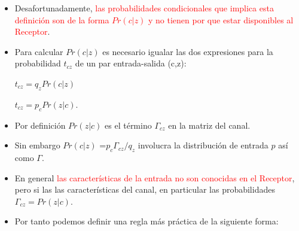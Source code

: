 \documentclass{beamer}
\theoremstyle{plain}
\theoremstyle{example}
\theoremstyle{example}
\begin{document}
\begin{frame}  \footnotesize
\begin{itemize} 

\item Desafortunadamente, \textcolor{red}{las probabilidades condicionales que implica esta definición son de la forma $Pr (c | z)$ y no tienen por que estar disponibles al Receptor}.

\item  Para calcular $Pr (c | z)$ es necesario igualar las dos expresiones para la probabilidad $t_{cz}$ de un par entrada-salida (c,z):

\begin{center}
$t_{cz}	= q_z Pr(c | z)$	      

$t_{cz}= p_c Pr(z | c)$.
\end{center}

\item  Por definición $Pr(z | c)$ es el término $\Gamma_{cz}$ en la matriz del canal. 

\item Sin embargo  $Pr(c | z)$ =$ p_c\Gamma_{cz}/ q_z$  involucra la distribución de entrada $p$ así como $\Gamma$. 

\item En general \textcolor{red}{las características de la entrada no son conocidas en el Receptor}, pero si las las características del canal, en particular las probabilidades  $\Gamma_{cz}=Pr(z | c)$. 

\item Por tanto podemos definir una regla más práctica de la siguiente forma:
   
\end{itemize} \end{frame} 
\end{document}
